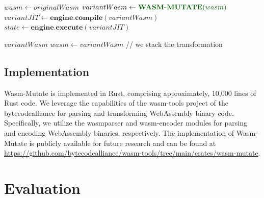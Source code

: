 \documentclass[a4paper,fleqn]{cas-dc}
\newcommand{\tool}{{\sc Wasm-Mutate}\xspace}
\newenvironment{revision1}{\color{blue}}{}
\newcommand{\repourl}{\url{https://github.com/bytecodealliance/wasm-tools/tree/main/crates/wasm-mutate}}
\begin{document}
\begin{revision1}
\begin{algorithm*}
\begin{algorithmic}[1]
        \State $wasm \gets originalWasm$
             \State $variantWasm \gets {\color{darkgreen}\textbf{WASM-MUTATE}(wasm)}$
                    \State $variantJIT \gets \textbf{engine.compile}(variantWasm)$
                        \State $state \gets \textbf{engine.execute}(variantJIT)$
        
                               \State \Return $variantWasm$
                            \EndIf
                            \State $wasm \gets variantWasm$ // we stack the transformation
                        \EndIf
                    \EndIf
                 \EndIf
             \EndIf
        \EndWhile
        \EndProcedure
	\end{algorithmic} 
	\caption{\tool in practice.} 
	\label{toolinpractice}
\end{algorithm*}

\end{revision1}

\subsection{Implementation}

\tool is implemented in Rust, comprising approximately, 10,000 lines of Rust code. 
We leverage the capabilities of the wasm-tools project of the bytecodealliance for parsing and transforming WebAssembly binary code. 
Specifically, we utilize the wasmparser and wasm-encoder modules for parsing and encoding WebAssembly binaries, respectively.
The implementation of \tool is publicly available for future research and can be found at \repourl.





\section {Evaluation}
\label{eval}
\end{document}

